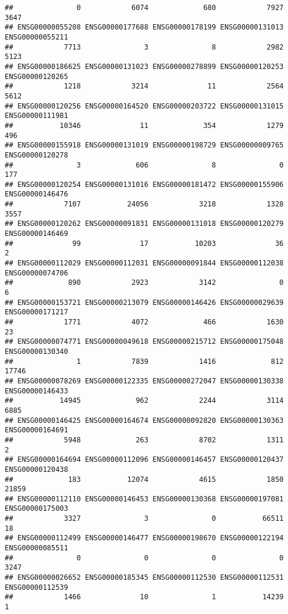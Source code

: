 \documentclass[
]{article}
\begin{document}
\begin{verbatim}
##               0            6074             680            7927            3647 
## ENSG00000055208 ENSG00000177688 ENSG00000178199 ENSG00000131013 ENSG00000055211 
##            7713               3               8            2982            5123 
## ENSG00000186625 ENSG00000131023 ENSG00000278899 ENSG00000120253 ENSG00000120265 
##            1218            3214              11            2564            5612 
## ENSG00000120256 ENSG00000164520 ENSG00000203722 ENSG00000131015 ENSG00000111981 
##           10346              11             354            1279             496 
## ENSG00000155918 ENSG00000131019 ENSG00000198729 ENSG00000009765 ENSG00000120278 
##               3             606               8               0             177 
## ENSG00000120254 ENSG00000131016 ENSG00000181472 ENSG00000155906 ENSG00000146476 
##            7107           24056            3218            1328            3557 
## ENSG00000120262 ENSG00000091831 ENSG00000131018 ENSG00000120279 ENSG00000146469 
##              99              17           10203              36               2 
## ENSG00000112029 ENSG00000112031 ENSG00000091844 ENSG00000112038 ENSG00000074706 
##             890            2923            3142               0               6 
## ENSG00000153721 ENSG00000213079 ENSG00000146426 ENSG00000029639 ENSG00000171217 
##            1771            4072             466            1630              23 
## ENSG00000074771 ENSG00000049618 ENSG00000215712 ENSG00000175048 ENSG00000130340 
##               1            7839            1416             812           17746 
## ENSG00000078269 ENSG00000122335 ENSG00000272047 ENSG00000130338 ENSG00000146433 
##           14945             962            2244            3114            6885 
## ENSG00000146425 ENSG00000164674 ENSG00000092820 ENSG00000130363 ENSG00000164691 
##            5948             263            8702            1311               2 
## ENSG00000164694 ENSG00000112096 ENSG00000146457 ENSG00000120437 ENSG00000120438 
##             183           12074            4615            1850           21859 
## ENSG00000112110 ENSG00000146453 ENSG00000130368 ENSG00000197081 ENSG00000175003 
##            3327               3               0           66511              18 
## ENSG00000112499 ENSG00000146477 ENSG00000198670 ENSG00000122194 ENSG00000085511 
##               0               0               0               0            3247 
## ENSG00000026652 ENSG00000185345 ENSG00000112530 ENSG00000112531 ENSG00000112539 
##            1466              10               1           14239               1 

\end{verbatim}
\end{document}
